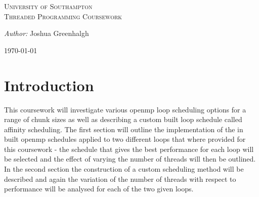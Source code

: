 \documentclass[12pt]{article} %
\begin{document}

\begin{titlepage}

\newcommand{\HRule}{\rule{\linewidth}{0.5mm}} %

\center %

\textsc{\LARGE University of Southampton}\\[1.5cm] %
\textsc{\Large Threaded Programming Coursework}\\[0.5cm] %

\begin{minipage}{0.4\textwidth}
\emph{Author:}
Joshua Greenhalgh %
\end{minipage}


{\large \today}\\[3cm] %


\vfill %

\end{titlepage}


\tableofcontents %

\newpage %


\section{Introduction} %

This coursework will investigate various openmp loop scheduling options for a range of chunk sizes as well as describing a custom built loop schedule called affinity scheduling. The first section will outline the implementation of the in built openmp schedules applied to two different loops that where provided for this coursework - the schedule that gives the best performance for each loop will be selected and the effect of varying the number of threads will then be outlined. In the second section the construction of a custom scheduling method will be described and again the variation of the number of threads with respect to performance will be analysed for each of the two given loops.   
\end{document}
